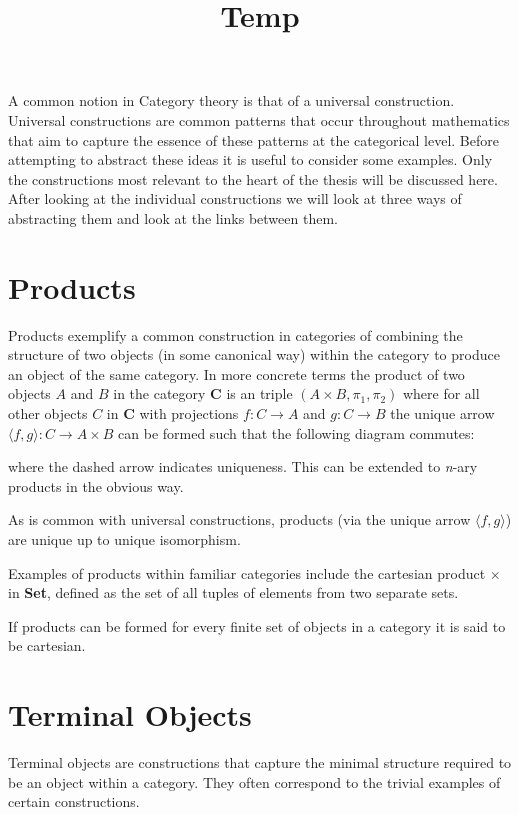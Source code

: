 \documentclass[a4paper,12pt]{article}
\date{}
\title{Temp\vspace{-3.5em}}
\begin{document}
\maketitle
A common notion in Category theory is that of a universal construction.
Universal constructions are common patterns that occur throughout mathematics
that aim to capture the essence of these patterns at the categorical level.
Before attempting to abstract these ideas it is useful to consider some
examples. Only the constructions most relevant to the heart of the thesis will
be discussed here.  After looking at the individual constructions we will look
at three ways of abstracting them and look at the links between them.

\section{Products}
Products exemplify a common construction in categories of combining the
structure of two objects (in some canonical way) within the category to produce
an object of the same category. In more concrete terms the product of two
objects $A$ and $B$ in the category $\textbf{C}$ is an triple $(A \times B,
\pi_{1}, \pi_{2})$ where for all other objects $C$ in $\textbf{C}$ with
projections $f: C \rightarrow A$ and $g: C \rightarrow B$ the unique arrow
$\langle f, g\rangle : C \rightarrow A \times B$ can be formed such that the
following diagram commutes:


where the dashed arrow indicates uniqueness. This can be extended to
\textit{n}-ary products in the obvious way.

As is common with universal constructions, products (via the unique arrow
$\langle f, g \rangle$) are unique up to unique isomorphism.

Examples of products within familiar categories include the cartesian product
$\times$ in \textbf{Set}, defined as the set of all tuples of elements from two
separate sets.

If products can be formed for every finite set of objects in a category it is
said to be cartesian.

\section{Terminal Objects}
Terminal objects are constructions that capture the
minimal structure required to be an object within a category. They often
correspond to the trivial examples of certain constructions.
\end{document}
